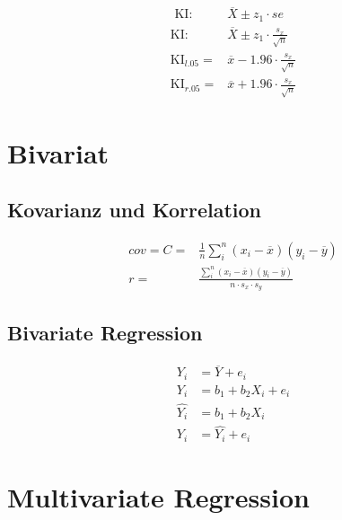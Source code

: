 \documentclass[
  10pt,
  letterpaper,
  a4paper, twoside]{scrreprt}
\begin{document}
\begin{align}
   \text{ KI:}& \overline{X}\pm z_1 \cdot se \label{eq:Konfidenz-Intervall-1}\\
   \text{KI:}& \overline{X}\pm z_1 \cdot \frac{s_x}{\sqrt{n}} \label{eq:Konfidenz-Intervall-2}\\
   \text{KI}_{l.05} =& \overline{x} - 1.96 \cdot \frac{s_x}{\sqrt{n}} \label{eq:Konfidenz-Intervall-3}\\
   \text{KI}_{r.05} =& \overline{x} + 1.96 \cdot \frac{s_x}{\sqrt{n}}\label{eq:Konfidenz-Intervall-4}
\end{align}

\section*{Bivariat}\label{bivariat}


\subsection*{Kovarianz und Korrelation}\label{kovarianz-und-korrelation}

\begin{align}
      cov = C =  & \frac{1}{n}\sum_i^n(x_i-\overline{x}) (y_i-\overline{y}) \label{eq:Covarianz} \\
      r = &  \frac{\sum_i^n(x_i-\overline{x})
          (y_i-\overline{y})}{n \cdot s_x \cdot s_y} \label{eq:Korrelation}
\end{align}

\subsection*{Bivariate Regression}\label{bivariate-regression-1}

\begin{align}
  Y_i & = \overline{Y} + e_i  \label{eq:Mittelwert-Modell} \\
  Y_i & = b_1 + b_2X_i + e_i \label{eq:Regressions-gleichung} \\ 
  \hat{Y_i} & = b_1 + b_2X_i \label{eq:Regressions-Modell} \\
  Y_i & = \hat{Y_i}+e_i \label{eq:Varianz-Modell-Residuum}
\end{align}

\section*{Multivariate Regression}\label{multivariate-regression}
\end{document}
